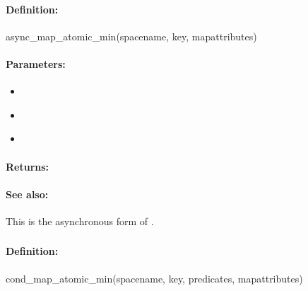 \paragraph{Definition:}
\begin{rubycode}
async_map_atomic_min(spacename, key, mapattributes)
\end{rubycode}

\paragraph{Parameters:}
\begin{itemize}[noitemsep]
\item {}\\

\item {}\\

\item {}\\

\end{itemize}

\paragraph{Returns:}


\paragraph{See also:}  This is the asynchronous form of .

\pagebreak
\subsubsection{}
\label{api:ruby:cond_map_atomic_min}


\paragraph{Definition:}
\begin{rubycode}
cond_map_atomic_min(spacename, key, predicates, mapattributes)
\end{rubycode}

